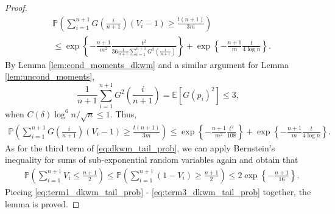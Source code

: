 \documentclass[11pt]{article}
\def\E{\mathbb{E}}
\renewcommand{\P}{\mathbb{P}}
\newcommand{\lb}{\left(}
\newcommand{\rb}{\right)}
\begin{document}
\begin{proof}
  \begin{align*}
    &\P\lb \sum_{i=1}^{n+1}G\left(\frac{i}{n+1}\right)(V_{i} - 1)\ge \frac{t(n+1)}{3m}\rb\\
    & \le \exp \left\{-\frac{n+1}{m^2}\frac{t^2}{36 \frac{1}{n+1}\sum_{i=1}^{n+1}G^2\lb\frac{i}{n+1}\rb}\right\} + \exp\left\{-\frac{n+1}{m}\frac{t}{4\log n}\right\}.
  \end{align*}
  By Lemma \ref{lem:cond_moments_dkwm} and a similar argument for Lemma \ref{lem:uncond_moments}, 
  \[\frac{1}{n+1}\sum_{i=1}^{n+1}G^2\lb\frac{i}{n+1}\rb = \E[G(p_i)^2] \le 3,\]
  when $C(\delta)\log^6 n / \sqrt{n}\le 1$. Thus, 
  \begin{align}
    \label{eq:term2_dkwm_tail_prob}
    \P\lb \sum_{i=1}^{n+1}G\left(\frac{i}{n+1}\right)(V_{i} - 1)\ge \frac{t(n+1)}{3m}\rb \le \exp \left\{-\frac{n+1}{m^2}\frac{t^2}{108}\right\} + \exp\left\{-\frac{n+1}{m}\frac{t}{4\log n}\right\}.
  \end{align}
  As for the third term of \eqref{eq:dkwm_tail_prob}, we can apply Bernstein's inequality for sums of sub-exponential random variables again and obtain that
  \begin{align}
    \label{eq:term3_dkwm_tail_prob}
    &\P\lb \sum_{i=1}^{n+1}V_{i} \le \frac{n+1}{2}\rb \le \P\lb \sum_{i=1}^{n+1}(1 - V_{i})\ge \frac{n+1}{2}\rb\le 2\exp\left\{-\frac{n+1}{16}\right\}.
  \end{align}
  Piecing \eqref{eq:term1_dkwm_tail_prob} - \eqref{eq:term3_dkwm_tail_prob} together, the lemma is proved. 
\end{proof}
\end{document}
